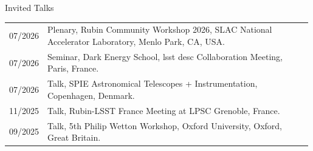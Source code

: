 \begin{rSection}{Invited Talks}
\setlength{\extrarowheight}{3pt}
    \begin{longtable}{p{0.1\linewidth}p{0.89\linewidth}}
    07/2026 & Plenary, Rubin Community Workshop 2026, SLAC National Accelerator Laboratory, Menlo Park, CA, USA. \\
    07/2026 & Seminar, Dark Energy School, \ac{lsst} \ac{desc} Collaboration Meeting, Paris, France. \\
    07/2026 & Talk, SPIE Astronomical Telescopes + Instrumentation, Copenhagen, Denmark. \\
    11/2025 & Talk, Rubin-LSST France Meeting at LPSC Grenoble, France. \\
    09/2025 & Talk, 5th Philip Wetton Workshop, Oxford University, Oxford, Great Britain. \\
    \end{longtable}

\end{rSection}
